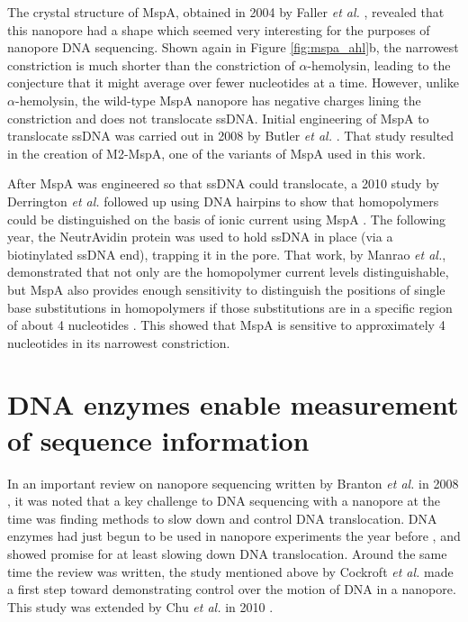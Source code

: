 The crystal structure of MspA, obtained in 2004 by Faller \textit{et al.} \citep{Faller2004}, revealed that this nanopore had a shape which seemed very interesting for the purposes of nanopore DNA sequencing.  Shown again in Figure \ref{fig:mspa_ahl}b, the narrowest constriction is much shorter than the constriction of $\alpha$-hemolysin, leading to the conjecture that it might average over fewer nucleotides at a time.  However, unlike $\alpha$-hemolysin, the wild-type MspA nanopore has negative charges lining the constriction and does not translocate ssDNA.  Initial engineering of MspA to translocate ssDNA was carried out in 2008 by Butler \textit{et al.} \citep{Butler2008}.  That study resulted in the creation of M2-MspA, one of the variants of MspA used in this work.

After MspA was engineered so that ssDNA could translocate, a 2010 study by Derrington \textit{et al.} followed up using DNA hairpins to show that homopolymers could be distinguished on the basis of ionic current using MspA \citep{Derrington2010}.  The following year, the NeutrAvidin protein was used to hold ssDNA in place (via a biotinylated ssDNA end), trapping it in the pore.  That work, by Manrao \textit{et al.}, demonstrated that not only are the homopolymer current levels distinguishable, but MspA also provides enough sensitivity to distinguish the positions of single base substitutions in homopolymers if those substitutions are in a specific region of about 4 nucleotides \citep{Manrao2011}.  This showed that MspA is sensitive to approximately 4 nucleotides in its narrowest constriction.


\section{DNA enzymes enable measurement of sequence information}

In an important review on nanopore sequencing written by Branton \textit{et al.} in 2008 \citep{Branton2008}, it was noted that a key challenge to DNA sequencing with a nanopore at the time was finding methods to slow down and control DNA translocation.  DNA enzymes had just begun to be used in nanopore experiments the year before \citep{Astier2007, Hornblower2007}, and showed promise for at least slowing down DNA translocation.  Around the same time the review was written, the study mentioned above by Cockroft \textit{et al.} \citep{Cockroft2008} made a first step toward demonstrating control over the motion of DNA in a nanopore.  This study was extended by Chu \textit{et al.} in 2010 \citep{Chu2010}.

